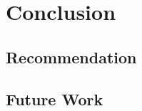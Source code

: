 \documentclass[ExampleMasters.tex]{subfiles}
\begin{document}
\clearpage
\chapter{Conclusion}
\label{chap:conclusion}

\section{Recommendation}
\label{sec:recommendation}
\section{Future Work}
\label{sec:future_work}
\end{document}
